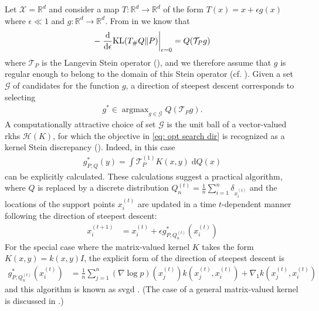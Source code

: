 \documentclass[12pt,paper=letter]{scrreprt}
\def\KL#1#2{\textnormal{KL}({#1}\Vert{#2})}
\providecommand{\argmax}{\mathop\mathrm{arg max}} %
\begin{document}
Let $\mathcal{X} = \mathbb{R}^d$ and consider a map $T : \mathbb{R}^d \rightarrow \mathbb{R}^d$ of the form $T(x) = x + \epsilon g(x)$ where $\epsilon \ll 1$ and $g : \mathbb{R}^d \rightarrow \mathbb{R}^d$.
From  in  we know that
\begin{align}
    - \left. \frac{\mathrm{d}}{\mathrm{d}\epsilon} \KL{T_\# Q}{P} \right|_{\epsilon = 0} = Q(\mathcal T_P g ) \label{equ:klstein00}
\end{align}
where $\mathcal{T}_P$ is the Langevin Stein operator (), and we therefore assume that $g$ is regular enough to belong to the domain of this Stein operator (cf. ).
Given a set $\mathcal{G}$ of candidates for the function $g$, a direction of steepest descent corresponds to selecting 
\begin{align}
    g^* \in \argmax_{g \in \mathcal{G}} Q(\mathcal{T}_P g) . \label{eq: opt search dir}
\end{align}
A computationally attractive choice of set $\mathcal{G}$ is the unit ball of a vector-valued \ac{rkhs} $\mathcal{H}(K)$, for which the objective in \eqref{eq: opt search dir} is recognized as a kernel Stein discrepancy ().
Indeed, in this case
\begin{align}
    g_{P,Q}^*(y) = \int \mathcal{T}_P^{(1)} K(x,y) \; \mathrm{d}Q(x) \label{equ:ffs}
\end{align}
can be explicitly calculated.
These calculations suggest a practical algorithm, where $Q$ is replaced by a discrete distribution $Q_n^{(t)} = \frac{1}{n} \sum_{i=1}^n \delta_{x_i^{(t)}}$ and the locations of the support points $x_i^{(t)}$ are updated in a time $t$-dependent manner following the direction of steepest descent:
\begin{align}
    x_i^{(t+1)} & = x_i^{(t)} + \epsilon g_{P,Q_n^{(t)}}^*(x_i^{(t)})  \label{eq: SVGD update rule}
\end{align}
For the special case where the matrix-valued kernel $K$ takes the form $K(x,y) = k(x,y) I$, the explicit form of the direction of steepest descent is
\begin{align}
    g_{P,Q_n^{(t)}}^*(x_i^{(t)}) & = \frac{1}{n}\sum_{j=1}^n  (\nabla \log p)(x_j^{(t)}) k( x_j^{(t)}, x_i^{(t)}) + \nabla_1 k(x_j^{(t)}, x_i^{(t)})  \label{eq: steep descent}
\end{align}
and this algorithm is known as \acf{svgd} \citep{Liu2016}.
(The case of a general matrix-valued kernel is discussed in \citet{zhuo2018message,wang2018stein}.)
\end{document}
